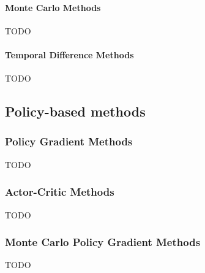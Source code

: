 \documentclass[../xlapes02]{subfiles}
\begin{document}
    \paragraph{Monte Carlo Methods}\label{par:monte-carlo-methods}
    TODO

    \paragraph{Temporal Difference Methods}\label{par:temporal-difference-methods}
    TODO

    \subsection{Policy-based methods}\label{subsec:policy-based-methods}

    \subsubsection{Policy Gradient Methods}\label{subsubsec:policy-gradient-methods}
    TODO

    \subsubsection{Actor-Critic Methods}\label{subsubsec:actor-critic-methods}
    TODO

    \subsubsection{Monte Carlo Policy Gradient Methods}\label{subsubsec:monte-carlo-policy-gradient-methods}
    TODO
\end{document}
